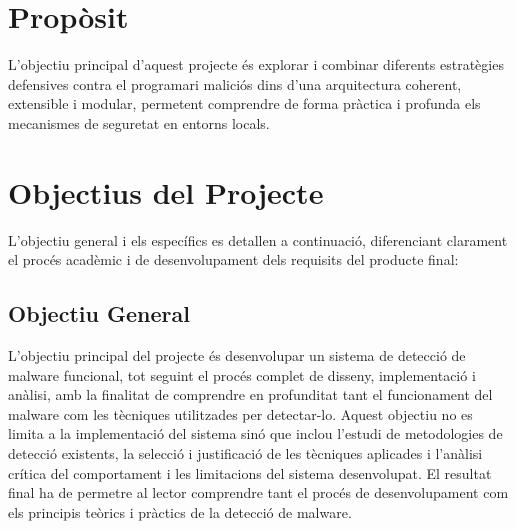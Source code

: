 \documentclass[12pt,a4paper]{report}
\begin{document}
\section{Propòsit}
L'objectiu principal d'aquest projecte és explorar i combinar diferents estratègies defensives contra el programari maliciós dins d'una arquitectura coherent, extensible i modular, permetent comprendre de forma pràctica i profunda els mecanismes de seguretat en entorns locals.

\section{Objectius del Projecte}
L'objectiu general i els específics es detallen a continuació, diferenciant clarament el procés acadèmic i de desenvolupament dels requisits del producte final:

\subsection{Objectiu General}
L'objectiu principal del projecte és desenvolupar un sistema de detecció de malware funcional, tot seguint el procés complet de disseny, implementació i anàlisi, amb la finalitat de comprendre en profunditat tant el funcionament del malware com les tècniques utilitzades per detectar-lo. Aquest objectiu no es limita a la implementació del sistema sinó que inclou l'estudi de metodologies de detecció existents, la selecció i justificació de les tècniques aplicades i l'anàlisi crítica del comportament i les limitacions del sistema desenvolupat. El resultat final ha de permetre al lector comprendre tant el procés de desenvolupament com els principis teòrics i pràctics de la detecció de malware.
\end{document}
